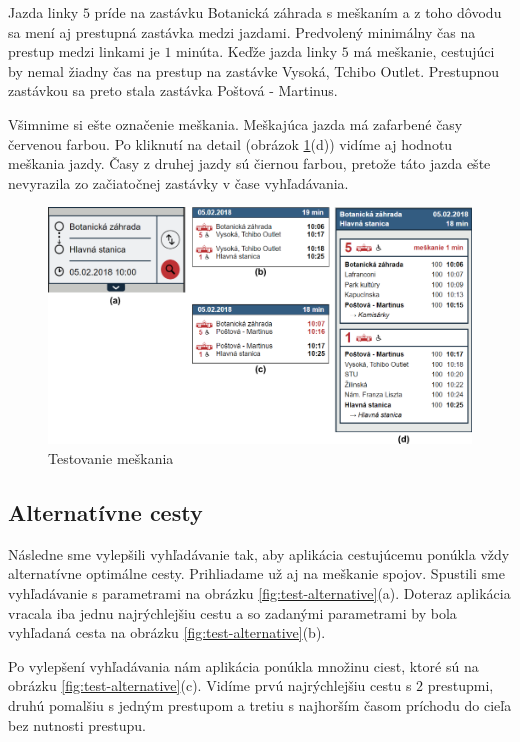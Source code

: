 Jazda linky $5$ príde na zastávku Botanická záhrada s meškaním a z toho dôvodu sa mení aj prestupná zastávka medzi jazdami. Predvolený minimálny čas na prestup medzi linkami je $1$ minúta. Keďže jazda linky $5$ má meškanie, cestujúci by nemal žiadny čas na prestup na zastávke Vysoká, Tchibo Outlet. Prestupnou zastávkou sa preto stala zastávka Poštová - Martinus.

Všimnime si ešte označenie meškania. Meškajúca jazda má zafarbené časy červenou farbou. Po kliknutí na detail (obrázok \ref{fig:test-delay}(d)) vidíme aj hodnotu meškania jazdy. Časy z druhej jazdy sú čiernou farbou, pretože táto jazda ešte nevyrazila zo začiatočnej zastávky v čase vyhľadávania. 

\begin{figure}[H]
\centerline{\includegraphics[width=1.0\textwidth]{images/test/delay}}
\caption[Testovanie meškania]{Testovanie meškania}
\label{fig:test-delay}
\end{figure}

\subsection{Alternatívne cesty}
Následne sme vylepšili vyhľadávanie tak, aby aplikácia cestujúcemu ponúkla vždy alternatívne optimálne cesty. Prihliadame už aj na meškanie spojov. Spustili sme vyhľadávanie s parametrami na obrázku \ref{fig:test-alternative}(a). Doteraz aplikácia vracala iba jednu najrýchlejšiu cestu a so zadanými parametrami by bola vyhľadaná cesta na obrázku \ref{fig:test-alternative}(b).

Po vylepšení vyhľadávania nám aplikácia ponúkla množinu ciest, ktoré sú na obrázku \ref{fig:test-alternative}(c). Vidíme prvú najrýchlejšiu cestu s $2$ prestupmi, druhú pomalšiu s jedným prestupom a tretiu s najhorším časom príchodu do cieľa bez nutnosti prestupu. 

